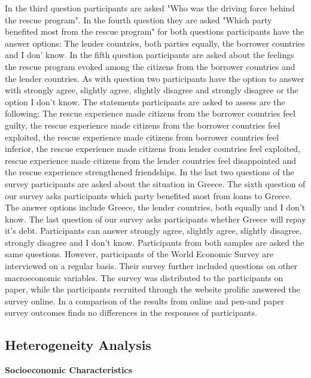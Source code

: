 In the third question participants are asked "Who was the driving force behind the rescue program". In the fourth question they are asked "Which party benefited most from the rescue program" for both questions participants have the answer options: The lender countries, both parties equally, the borrower countries and I don' know. In the fifth question participants are asked about the feelings the rescue program evoked among the citizens from the borrower countries and the lender countries. As with question two participants have the option to answer with strongly agree, slightly agree, slightly disagree and strongly disagree or the option I don't know. The statements participants are asked to assess are the following: The rescue experience made citizens from the borrower countries feel guilty, the rescue experience made citizens from the borrower countries feel exploited, the rescue experience made citizens from borrower countries feel inferior, the rescue experience made citizens from lender countries feel exploited, rescue experience made citizens from the lender countries feel disappointed and the rescue experience strengthened friendships. In the last two questions of the survey participants are asked about the situation in Greece. The sixth question of our survey asks participants which party benefited most from loans to Greece. The answer options include Greece, the lender countries, both equally and I don't know. The last question of our survey asks participants whether Greece will repay it's debt. Participants can answer strongly agree, slightly agree, slightly disagree, strongly disagree and I don't know. Participants from both samples are asked the same questions. However, participants of the World Economic Survey are interviewed on a regular basis. Their survey further included questions on other macroeconomic variables. The survey was distributed to the participants on paper, while the participants recruited through the website prolific answered the survey online. In a comparison of the results from online and pen-and paper survey outcomes \cite{abel} finds no differences in the responses of participants. 


\subsection{Heterogeneity Analysis}
\textbf{Socioeconomic Characteristics}

